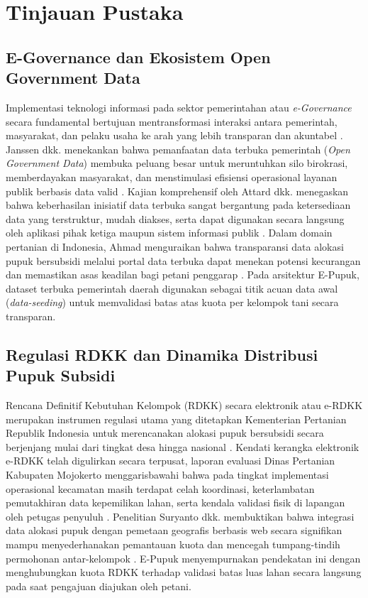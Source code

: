 \documentclass[conference]{IEEEtran}
\begin{document}
\section{Tinjauan Pustaka}
\subsection{E-Governance dan Ekosistem Open Government Data}
Implementasi teknologi informasi pada sektor pemerintahan atau \textit{e-Governance} secara fundamental bertujuan mentransformasi interaksi antara pemerintah, masyarakat, dan pelaku usaha ke arah yang lebih transparan dan akuntabel \cite{b1}. Janssen dkk. menekankan bahwa pemanfaatan data terbuka pemerintah (\textit{Open Government Data}) membuka peluang besar untuk meruntuhkan silo birokrasi, memberdayakan masyarakat, dan menstimulasi efisiensi operasional layanan publik berbasis data valid \cite{b2}. Kajian komprehensif oleh Attard dkk. menegaskan bahwa keberhasilan inisiatif data terbuka sangat bergantung pada ketersediaan data yang terstruktur, mudah diakses, serta dapat digunakan secara langsung oleh aplikasi pihak ketiga maupun sistem informasi publik \cite{b3}. Dalam domain pertanian di Indonesia, Ahmad menguraikan bahwa transparansi data alokasi pupuk bersubsidi melalui portal data terbuka dapat menekan potensi kecurangan dan memastikan asas keadilan bagi petani penggarap \cite{b6}. Pada arsitektur E-Pupuk, dataset terbuka pemerintah daerah digunakan sebagai titik acuan data awal (\textit{data-seeding}) untuk memvalidasi batas atas kuota per kelompok tani secara transparan.

\subsection{Regulasi RDKK dan Dinamika Distribusi Pupuk Subsidi}
Rencana Definitif Kebutuhan Kelompok (RDKK) secara elektronik atau e-RDKK merupakan instrumen regulasi utama yang ditetapkan Kementerian Pertanian Republik Indonesia untuk merencanakan alokasi pupuk bersubsidi secara berjenjang mulai dari tingkat desa hingga nasional \cite{b4}. Kendati kerangka elektronik e-RDKK telah digulirkan secara terpusat, laporan evaluasi Dinas Pertanian Kabupaten Mojokerto menggarisbawahi bahwa pada tingkat implementasi operasional kecamatan masih terdapat celah koordinasi, keterlambatan pemutakhiran data kepemilikan lahan, serta kendala validasi fisik di lapangan oleh petugas penyuluh \cite{b5}. Penelitian Suryanto dkk. membuktikan bahwa integrasi data alokasi pupuk dengan pemetaan geografis berbasis web secara signifikan mampu menyederhanakan pemantauan kuota dan mencegah tumpang-tindih permohonan antar-kelompok \cite{b7}. E-Pupuk menyempurnakan pendekatan ini dengan menghubungkan kuota RDKK terhadap validasi batas luas lahan secara langsung pada saat pengajuan diajukan oleh petani.
\end{document}
